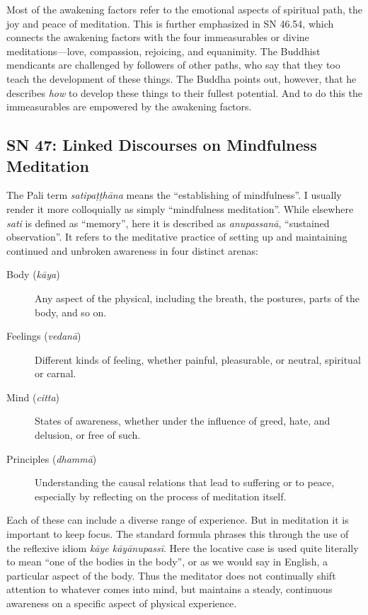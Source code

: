 \documentclass[12pt,openany]{book}%
\begin{document}
Most of the awakening factors refer to the emotional aspects of spiritual path, the joy and peace of meditation. This is further emphasized in SN 46.54, which connects the awakening factors with the four immeasurables or divine meditations—love, compassion, rejoicing, and equanimity. The Buddhist mendicants are challenged by followers of other paths, who say that they too teach the development of these things. The Buddha points out, however, that he describes \emph{how} to develop these things to their fullest potential. And to do this the immeasurables are empowered by the awakening factors.

\subsection*{SN 47: Linked Discourses on Mindfulness Meditation}

The Pali term \textit{\textsanskrit{satipaṭṭhāna}} means the “establishing of mindfulness”. I usually render it more colloquially as simply “mindfulness meditation”. While elsewhere \textit{sati} is defined as “memory”, here it is described as \textit{\textsanskrit{anupassanā}}, “sustained observation”. It refers to the meditative practice of setting up and maintaining continued and unbroken awareness in four distinct arenas:

\begin{description}%
\item[Body (\textit{\textsanskrit{kāya}})] Any aspect of the physical, including the breath, the postures, parts of the body, and so on.%
\item[Feelings (\textit{\textsanskrit{vedanā}})] Different kinds of feeling, whether painful, pleasurable, or neutral, spiritual or carnal.%
\item[Mind (\textit{citta})] States of awareness, whether under the influence of greed, hate, and delusion, or free of such.%
\item[Principles (\textit{\textsanskrit{dhammā}})] Understanding the causal relations that lead to suffering or to peace, especially by reflecting on the process of meditation itself.%
\end{description}

Each of these can include a diverse range of experience. But in meditation it is important to keep focus. The standard formula phrases this through the use of the reflexive idiom \textit{\textsanskrit{kāye} \textsanskrit{kāyānupassī}}. Here the locative case is used quite literally to mean “one of the bodies in the body”, or as we would say in English, a particular aspect of the body. Thus the meditator does not continually shift attention to whatever comes into mind, but maintains a steady, continuous awareness on a specific aspect of physical experience.
\end{document}
